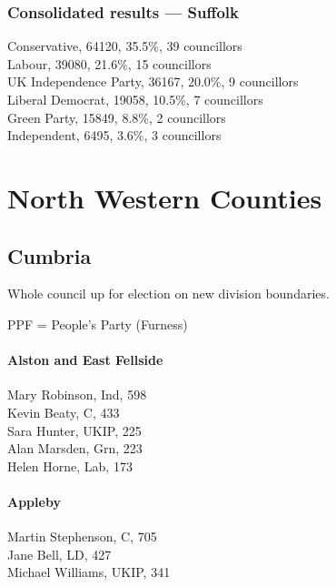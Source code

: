 \documentclass[a4paper,openany,10pt]{book}
\begin{document}
\subsection*{Consolidated results --- Suffolk}
Conservative, 64120, 35.5\%, 39 councillors\\
Labour, 39080, 21.6\%, 15 councillors\\
UK Independence Party, 36167, 20.0\%, 9 councillors\\
Liberal Democrat, 19058, 10.5\%, 7 councillors\\
Green Party, 15849, 8.8\%, 2 councillors\\
Independent, 6495, 3.6\%, 3 councillors\\


\chapter{North Western Counties}

\section{Cumbria}

Whole council up for election on new division boundaries.

PPF = People's Party (Furness)



\subsubsection*{Alston and East Fellside}



Mary Robinson, Ind, 598\\
Kevin Beaty, C, 433\\
Sara Hunter, UKIP, 225\\
Alan Marsden, Grn, 223\\
Helen Horne, Lab, 173\\


\subsubsection*{Appleby}



Martin Stephenson, C, 705\\
Jane Bell, LD, 427\\
Michael Williams, UKIP, 341\\
\end{document}
